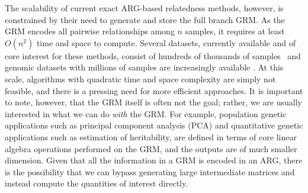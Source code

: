 
The scalability of current exact ARG-based relatedness methods, however, is constrained by
their need to generate and store the full branch GRM. As the GRM encodes all 
pairwise relationships among $n$ samples, it requires at least $O(n^2)$
time and space to compute. 
Several datasets, currently available and of core interest for these 
methods, consist of hundreds of thousands of 
samples~\citep{caulfield2017national,turnbull2018100,
bycroft2018genome,backman2021exome,Ros-Freixedes2022pig_wgs_variants,
halldorsson2022sequences,uk2023whole,all2024genomic}
and genomic datasets with millions of samples are increasingly available
\citep[e.g.][]{Cesarani2022, stark2024call,cook2025our, Cole2025Invited}.
At this scale, algorithms with quadratic time and space complexity are simply
not feasible, and there is a pressing need for more efficient approaches.
It is important to note, however, that the GRM itself is often not the goal;
rather, we are usually interested in what we can do \emph{with} the GRM.
For example, population genetic applications such as principal component analysis (PCA)
and quantitative genetic applications such as estimation of heritability, are
defined in terms of core linear algebra operations performed on the GRM,
and the outputs are of much smaller dimension. Given that all the information
in a GRM is encoded in an ARG, there is the possibility that we can bypass
generating large intermediate matrices and instead compute the quantities
of interest directly.




